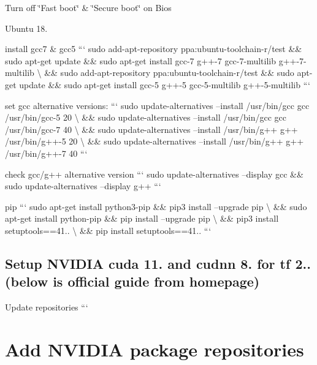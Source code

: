 
\begin{DoxyItemize}
\item Turn off \char`\"{}\+Fast boot\char`\"{} \& \char`\"{}\+Secure boot\char`\"{} on Bios
\item Ubuntu 18.
\item install gcc7 \& gcc5 ``` sudo add-\/apt-\/repository ppa\+:ubuntu-\/toolchain-\/r/test \&\& sudo apt-\/get update \&\& sudo apt-\/get install gcc-\/7 g++-\/7 gcc-\/7-\/multilib g++-\/7-\/multilib \textbackslash{} \&\& sudo add-\/apt-\/repository ppa\+:ubuntu-\/toolchain-\/r/test \&\& sudo apt-\/get update \&\& sudo apt-\/get install gcc-\/5 g++-\/5 gcc-\/5-\/multilib g++-\/5-\/multilib ```
\item set gcc alternative versions\+: ``` sudo update-\/alternatives --install /usr/bin/gcc gcc /usr/bin/gcc-\/5 20 \textbackslash{} \&\& sudo update-\/alternatives --install /usr/bin/gcc gcc /usr/bin/gcc-\/7 40 \textbackslash{} \&\& sudo update-\/alternatives --install /usr/bin/g++ g++ /usr/bin/g++-\/5 20 \textbackslash{} \&\& sudo update-\/alternatives --install /usr/bin/g++ g++ /usr/bin/g++-\/7 40 ```
\item check gcc/g++ alternative version ``` sudo update-\/alternatives --display gcc \&\& sudo update-\/alternatives --display g++ ```
\item pip ``` sudo apt-\/get install python3-\/pip \&\& pip3 install --upgrade pip \textbackslash{} \&\& sudo apt-\/get install python-\/pip \&\& pip install --upgrade pip \textbackslash{} \&\& pip3 install setuptools==41.. \textbackslash{} \&\& pip install setuptools==41.. ```
\end{DoxyItemize}

\subsection*{Setup N\+V\+I\+D\+IA cuda 11. and cudnn 8. for tf 2.. (below is official guide from homepage)}


\begin{DoxyItemize}
\item Update repositories ``` \section*{Add N\+V\+I\+D\+IA package repositories}
\end{DoxyItemize}

